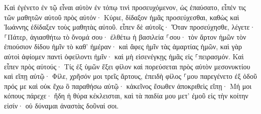 \documentclass{openreader}
\begin{document}
Καὶ ἐγένετο ἐν τῷ εἶναι αὐτὸν ἐν τόπῳ τινὶ προσευχόμενον, ὡς ἐπαύσατο, εἶπέν τις τῶν μαθητῶν αὐτοῦ πρὸς αὐτόν· Κύριε, δίδαξον ἡμᾶς προσεύχεσθαι, καθὼς καὶ Ἰωάννης ἐδίδαξεν τοὺς μαθητὰς αὐτοῦ. 
εἶπεν δὲ αὐτοῖς· Ὅταν προσεύχησθε, λέγετε· ⸀Πάτερ, ἁγιασθήτω τὸ ὄνομά σου· ἐλθέτω ἡ βασιλεία ⸀σου· 
τὸν ἄρτον ἡμῶν τὸν ἐπιούσιον δίδου ἡμῖν τὸ καθ’ ἡμέραν· 
καὶ ἄφες ἡμῖν τὰς ἁμαρτίας ἡμῶν, καὶ γὰρ αὐτοὶ ἀφίομεν παντὶ ὀφείλοντι ἡμῖν· καὶ μὴ εἰσενέγκῃς ἡμᾶς εἰς ⸀πειρασμόν. 
Καὶ εἶπεν πρὸς αὐτούς· Τίς ἐξ ὑμῶν ἕξει φίλον καὶ πορεύσεται πρὸς αὐτὸν μεσονυκτίου καὶ εἴπῃ αὐτῷ· Φίλε, χρῆσόν μοι τρεῖς ἄρτους, 
ἐπειδὴ φίλος ⸀μου παρεγένετο ἐξ ὁδοῦ πρός με καὶ οὐκ ἔχω ὃ παραθήσω αὐτῷ· 
κἀκεῖνος ἔσωθεν ἀποκριθεὶς εἴπῃ· Μή μοι κόπους πάρεχε· ἤδη ἡ θύρα κέκλεισται, καὶ τὰ παιδία μου μετ’ ἐμοῦ εἰς τὴν κοίτην εἰσίν· οὐ δύναμαι ἀναστὰς δοῦναί σοι. 
\end{document}
